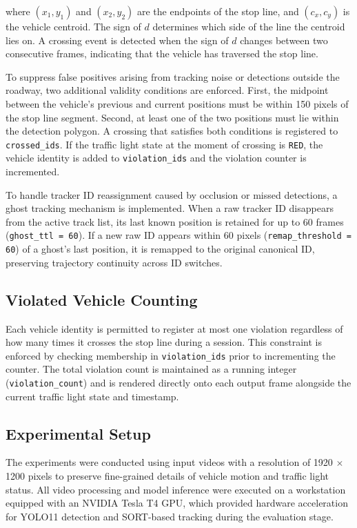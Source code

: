 \noindent where $(x_1, y_1)$ and $(x_2, y_2)$ are the endpoints of the stop line, and $(c_x, c_y)$ is the vehicle centroid. The sign of $d$ determines which side of the line the centroid lies on. A crossing event is detected when the sign of $d$ changes between two consecutive frames, indicating that the vehicle has traversed the stop line.

To suppress false positives arising from tracking noise or detections outside the roadway, two additional validity conditions are enforced. First, the midpoint between the vehicle's previous and current positions must be within 150 pixels of the stop line segment. Second, at least one of the two positions must lie within the detection polygon. A crossing that satisfies both conditions is registered to \texttt{crossed\_ids}. If the traffic light state at the moment of crossing is \texttt{RED}, the vehicle identity is added to \texttt{violation\_ids} and the violation counter is incremented.

To handle tracker ID reassignment caused by occlusion or missed detections, a ghost tracking mechanism is implemented. When a raw tracker ID disappears from the active track list, its last known position is retained for up to 60 frames (\texttt{ghost\_ttl = 60}). If a new raw ID appears within 60 pixels (\texttt{remap\_threshold = 60}) of a ghost's last position, it is remapped to the original canonical ID, preserving trajectory continuity across ID switches.

\subsection{Violated Vehicle Counting}
Each vehicle identity is permitted to register at most one violation regardless of how many times it crosses the stop line during a session. This constraint is enforced by checking membership in \texttt{violation\_ids} prior to incrementing the counter. The total violation count is maintained as a running integer (\texttt{violation\_count}) and is rendered directly onto each output frame alongside the current traffic light state and timestamp.

\subsection{Experimental Setup}
The experiments were conducted using input videos with a resolution of 1920 $\times$ 1200 pixels to preserve fine-grained details of vehicle motion and traffic light status. All video processing and model inference were executed on a workstation equipped with an NVIDIA Tesla T4 GPU, which provided hardware acceleration for YOLO11 detection and SORT-based tracking during the evaluation stage.
